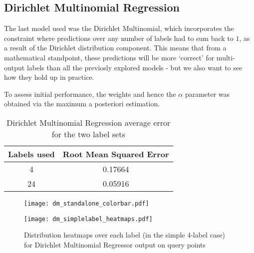 \subsection{Dirichlet Multinomial Regression}

The last model used was the Dirichlet Multinomial, which incorporates the constraint where predictions over any number of labels had to sum back to $1$, as a result of the Dirichlet distribution component. This means that from a mathematical standpoint, these predictions will be more `correct' for multi-output labels than all the previosly explored models - but we also want to see how they hold up in practice.

To assess initial performance, the weights and hence the $\alpha$ parameter was obtained via the maximum a posteriori estimation.


\begin{table}
    \centering
    \begin{tabular}{|c|c|}
        \hline
        Labels used & Root Mean Squared Error \\\hline
        4 & 0.17664\\
        24  & 0.05916\\
        \hline
    \end{tabular}
    \label{table:dmbasicresults}
    \caption{Dirichlet Multinomial Regression average error for the two label sets}
\end{table}

\begin{figure}
    \begin{minipage}{\linewidth}
        \centerline{\texttt{[image: dm\_standalone\_colorbar.pdf]}}
        \centerline{\texttt{[image: dm\_simplelabel\_heatmaps.pdf]}}
        \caption{Distribution heatmaps over each label (in the simple 4-label case) for Dirichlet Multinomial Regressor output on query points}
        \label{fig:dm_4label_heatmap}
    \end{minipage}
    \hfill
\end{figure}

